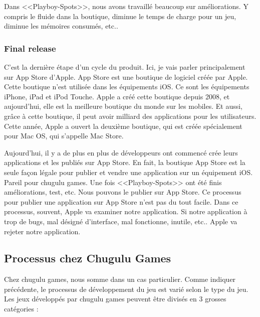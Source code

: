 Dans <<Playboy-Spots>>, nous avons travaillé beaucoup sur améliorations. Y compris le fluide dans la boutique, diminue le temps de charge pour un jeu, diminue les mémoires consumés, etc.. 


\subsubsection{Final release} %
\label{ssub:final_release}

C'est la dernière étape d'un cycle du produit. Ici, je vais parler principalement sur App Store d'Apple. App Store est une boutique de logiciel créée par Apple. Cette boutique n'est utilisée dans les équipements iOS. Ce sont les équipements iPhone, iPad et iPod Touche. Apple a créé cette boutique depuis 2008, et aujourd'hui, elle est la meilleure boutique du monde sur les mobiles. Et aussi, grâce à cette boutique, il peut avoir milliard des applications pour les utilisateurs. Cette année, Apple a ouvert la deuxième boutique, qui est créée spécialement pour Mac OS, qui s'appelle Mac Store. 

Aujourd'hui, il y a de plus en plus de développeurs ont commencé crée leurs applications et les publiés sur App Store. En fait, la boutique App Store est la seule façon légale pour publier et vendre une application sur un équipement iOS. Pareil pour chugulu games. Une fois <<Playboy-Spots>> ont été finis améliorations, test, etc. Nous pouvons le publier sur App Store. Ce processus pour publier une application sur App Store n'est pas du tout facile. Dans ce processus, souvent, Apple va examiner notre application. Si notre application à trop de bugs, mal désigné d'interface, mal fonctionne, inutile, etc.. Apple va rejeter notre application.



\subsection{Processus chez Chugulu Games} %
\label{sub:processus_chez_chugulu_games}

Chez chugulu games, nous somme dans un cas particulier. Comme indiquer précédente, le processus de développement du jeu est varié selon le type du jeu. Les jeux développés par chugulu games peuvent être divisés en 3 grosses catégories : 

